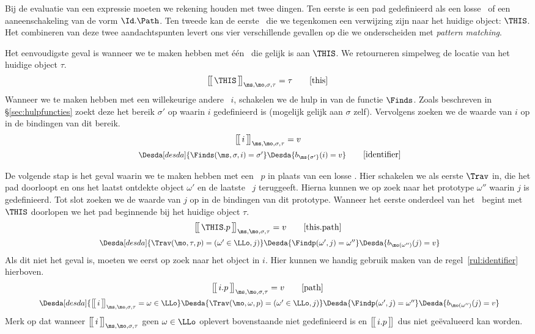Bij de evaluatie van een \Path\-expressie moeten we rekening houden met twee dingen. Ten eerste is een pad gedefinieerd als een losse \Id\ of een aaneenschakeling van de vorm $\Id.\Path$. Ten tweede kan de eerste \Id\ die we tegenkomen een verwijzing zijn naar het huidige object: $\THIS$. Het combineren van deze twee aandachtspunten levert ons vier verschillende gevallen op die we onderscheiden met \emph{pattern matching}.

Het eenvoudigste geval is wanneer we te maken hebben met één \Id\ die gelijk is aan $\THIS$. We retourneren simpelweg de locatie van het huidige object $\tau$.
%
\begin{equation*}
  \Express{\THIS}{\ms,\mo,\sigma,\tau} = \tau
  \tag*{[this]}
\end{equation*}
%
Wanneer we te maken hebben met een willekeurige andere \Id\ $i$, schakelen we de hulp in van de functie $\Finds$. Zoals beschreven in §\ref{sec:hulpfuncties} zoekt deze het bereik $\sigma'$ op waarin $i$ gedefinieerd is (mogelijk gelijk aan $\sigma$ zelf). Vervolgens zoeken we de waarde van $i$ op in de bindingen van dit bereik.
%
\begin{gather*}
  \Express{i}{\ms,\mo,\sigma,\tau} = v \\
  \Desdas{
    \Desda[desda]{\Finds(\ms, \sigma, i) = \sigma'}
    \Desda{b_{\ms{\sigma'}}(i) = v}
  }
  \tag*{[identifier]}\label{rul:identifier}
\end{gather*}

De volgende stap is het geval waarin we te maken hebben met een \Path\ $p$ in plaats van een losse \Id. Hier schakelen we als eerste $\Trav$ in, die het pad doorloopt en ons het laatst ontdekte object $\omega'$ en de laatste \Id\ $j$ teruggeeft. Hierna kunnen we op zoek naar het prototype $\omega''$ waarin $j$ is gedefinieerd. Tot slot zoeken we de waarde van $j$ op in de bindingen van dit prototype. Wanneer het eerste onderdeel van het \Path\ begint met $\THIS$ doorlopen we het pad beginnende bij het huidige object $\tau$.
%
\begin{gather*}
  \Express{\THIS.p}{\ms,\mo,\sigma,\tau} = v
  \tag*{[this.path]} \\
  \Desdas{
    \Desda[desda]{\Trav(\mo, \tau, p) = (\omega' \in \LLo, j)}
    \Desda{\Findp(\omega',j) = \omega''}
    \Desda{b_{\mo(\omega'')}(j) = v}
  }
\end{gather*}
%
Als dit niet het geval is, moeten we eerst op zoek naar het object in $i$. Hier kunnen we handig gebruik maken van de regel~\ref{rul:identifier} hierboven.
%
\begin{gather*}
  \Express{i.p}{\ms,\mo,\sigma,\tau} = v
  \tag*{[path]} \\
  \Desdas{
    \Desda[desda]{\Express{i}{\ms,\mo,\sigma,\tau} = \omega \in \LLo}
    \Desda{\Trav(\mo, \omega, p) = (\omega' \in \LLo, j)}
    \Desda{\Findp(\omega',j) = \omega''}
    \Desda{b_{\mo(\omega'')}(j) = v}
  }
\end{gather*}
%
Merk op dat wanneer $\Express{i}{\ms,\mo,\sigma,\tau}$ geen $\omega\in\LLo$ oplevert bovenstaande niet gedefinieerd is en $\big[\!\big[\,i.p\,\big]\!\big]^\text{}_{}$ dus niet geëvalueerd kan worden.

